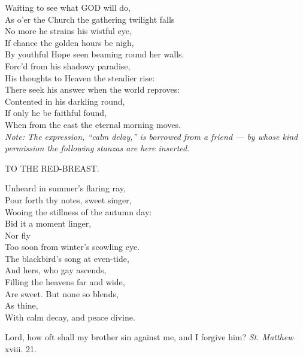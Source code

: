  Waiting to see what GOD will do, \\
 As o’er the Church the gathering twilight falls \\
 No more he strains his wistful eye, \\
 If chance the golden hours be nigh, \\
 By youthful Hope seen beaming round her walls. \\
  Forc’d from his shadowy paradise, \\
 His thoughts to Heaven the steadier rise: \\
 There seek his answer when the world reproves: \\
 Contented in his darkling round, \\
 If only he be faithful found, \\
 When from the east the eternal morning moves. \\

\emph{Note: The expression, “calm delay,” is borrowed from a friend — by whose kind permission the following stanzas are here inserted}.

TO THE RED-BREAST.

Unheard in summer’s flaring ray, \\
 Pour forth thy notes, sweet singer, \\
 Wooing the stillness of the autumn day: \\
 Bid it a moment linger,\\
 Nor fly \\
 Too soon from winter’s scowling eye. \\
  The blackbird’s song at even-tide, \\
 And hers, who gay ascends, \\
 Filling the heavens far and wide, \\
 Are sweet. But none so blends, \\
 As thine, \\
 With calm decay, and peace divine.\\


Lord, how oft shall my brother sin against me, and I forgive him? \emph{St. Matthew} xviii. 21.

